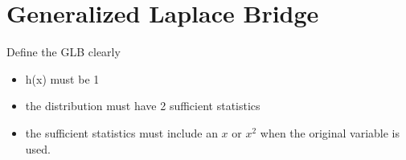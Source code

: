 \section{Generalized Laplace Bridge}
\label{sec:GLB}

Define the GLB clearly

\begin{itemize}
	\item h(x) must be 1
	\item the distribution must have 2 sufficient statistics
	\item the sufficient statistics must include an $x$ or $x^2$ when the original variable is used. 
\end{itemize}